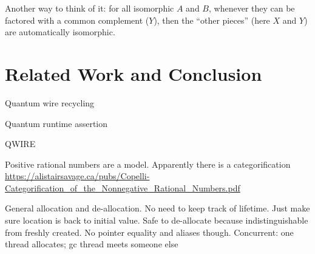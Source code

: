\documentclass[sigplan,10pt,review,anonymous]{acmart}
\begin{document}
Another way to think of it: for all isomorphic
$A$ and $B$, whenever they can be factored with a
common complement ($Y$), then the ``other pieces''
(here $X$ and $Y$) are automatically isomorphic.

\section{Related Work and Conclusion}

Quantum wire recycling~\cite{PhysRevA.94.042337}

Quantum runtime assertion~\cite{DBLP:journals/cal/ZhouB19}

QWIRE~\cite{Paykin:2017:QCL:3009837.3009894}

Positive rational numbers are a model. Apparently there is a
categorification
\url{https://alistairsavage.ca/pubs/Copelli-Categorification_of_the_Nonnegative_Rational_Numbers.pdf}

General allocation and de-allocation. No need to keep track of
lifetime. Just make sure location is back to initial value. Safe to
de-allocate because indistinguishable from freshly created. No pointer
equality and aliases though. Concurrent: one thread allocates; gc
thread meets someone else


\end{document}

